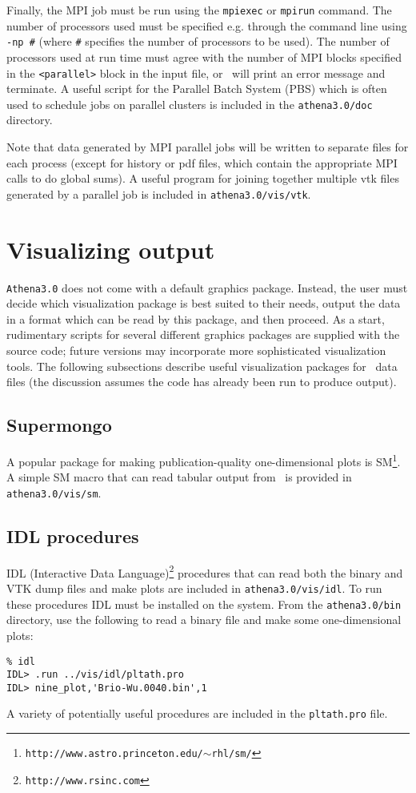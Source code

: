 Finally, the MPI job must be run using the {\tt mpiexec} or {\tt mpirun}
command.  The number of processors used must be specified e.g. through the
command line using {\tt -np \#} (where {\tt \#} specifies the number of
processors to be used).  The number of processors used at run time must
agree with the number of MPI blocks specified in the {\tt <parallel>}
block in the input file, or \ath\ will print an error message and
terminate.  A useful script for the Parallel Batch System (PBS) which
is often used to schedule jobs on parallel clusters is included in the
{\tt athena3.0/doc} directory.

Note that data generated by MPI parallel jobs will be written to separate files
for each process (except for history or pdf files, which contain the
appropriate MPI calls to do global sums).  A useful program for joining
together multiple vtk files generated by a parallel job is
included in {\tt athena3.0/vis/vtk}.

\section{Visualizing output}

{\tt Athena3.0} does not come with a default graphics package.  Instead,
the user must decide which visualization package is best suited to their
needs, output the data in a format which can be read by this package,
and then proceed.  As a start, rudimentary scripts for several different
graphics packages are supplied with the source code; future versions
may incorporate more sophisticated visualization tools.  The following
subsections describe useful visualization packages for \ath\ data files
(the discussion assumes the code has already been run to produce output).

\subsection{Supermongo}

A popular package for making publication-quality one-dimensional plots
is SM\footnote{{\tt http://www.astro.princeton.edu/$\sim$rhl/sm/}}.  A simple
SM macro that can read tabular output from \ath\ is provided in {\tt
athena3.0/vis/sm}.

\subsection{IDL procedures}

IDL (Interactive Data Language)\footnote{{\tt http://www.rsinc.com}}
procedures that can read both the binary and VTK dump files and make plots
are included in {\tt athena3.0/vis/idl}.  To run these procedures
IDL must be installed on the system.  From the {\tt athena3.0/bin} directory, use
the following to read a binary file and make some one-dimensional plots:
\begin{verbatim}
% idl
IDL> .run ../vis/idl/pltath.pro 
IDL> nine_plot,'Brio-Wu.0040.bin',1
\end{verbatim}
A variety of potentially useful
procedures are included in the {\tt pltath.pro} file.

